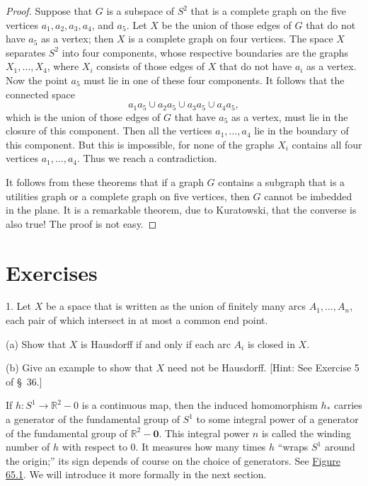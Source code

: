 \begin{proof}
Suppose that \(G\) is a subspace of \(S^{2}\) that is a complete graph on the five vertices \(a_{1},a_{2},a_{3},a_{4}\), and \(a_{5}\). Let \(X\) be the union of those edges of \(G\) that do not have \(a_{5}\) as a vertex; then \(X\) is a complete graph on four vertices. The space \(X\) separates \(S^{2}\) into four components, whose respective boundaries are the graphs \(X_{1},\ldots ,X_{4}\), where \(X_{i}\) consists of those edges of \(X\) that do not have \(a_{i}\) as a vertex. Now the point \(a_{5}\) must lie in one of these four components. It follows that the connected space
\[
a_{1}a_{5} \cup {a}_{2}a_{5} \cup {a}_{3}a_{5} \cup {a}_{4}a_{5},
\]
which is the union of those edges of \(G\) that have \(a_{5}\) as a vertex, must lie in the closure of this component. Then all the vertices \(a_{1},\ldots ,a_{4}\) lie in the boundary of this component. But this is impossible, for none of the graphs \(X_{i}\) contains all four vertices \(a_{1},\ldots ,a_{4}\). Thus we reach a contradiction.

It follows from these theorems that if a graph \(G\) contains a subgraph that is a utilities graph or a complete graph on five vertices, then \(G\) cannot be imbedded in the plane. It is a remarkable theorem, due to Kuratowski, that the converse is also true! The proof is not easy.
\end{proof}
\section*{Exercises}

1. Let \(X\) be a space that is written as the union of finitely many arcs \(A_{1},\ldots ,A_{n}\), each pair of which intersect in at most a common end point.

(a) Show that \(X\) is Hausdorff if and only if each arc \(A_{i}\) is closed in \(X\).

(b) Give an example to show that \(X\) need not be Hausdorff. [Hint: See Exercise 5 of \S\ 36.]


If \(h : S^{1} \rightarrow {\mathbb{R}}^{2} - 0\) is a continuous map, then the induced homomorphism \(h_{ * }\) carries a generator of the fundamental group of \(S^{1}\) to some integral power of a generator of the fundamental group of \(\mathbb{R}^{2} - \mathbf{0}\). This integral power \(n\) is called the winding number of \(h\) with respect to 0. It measures how many times \(h\) ``wraps \(S^{1}\) around the origin;'' its sign depends of course on the choice of generators. See \hyperref[fig:65.1]{Figure 65.1}. We will introduce it more formally in the next section.

